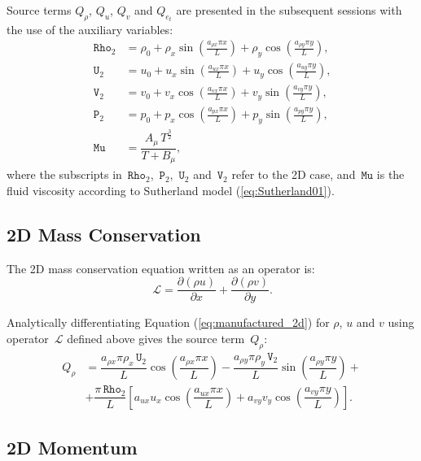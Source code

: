 \documentclass[10pt]{article}
\newcommand{\Diff}[2] {\dfrac{\partial( #1)}{\partial #2}}
\newcommand{\Rho}{\,\mathtt{Rho}}
\newcommand{\PP}{\,\mathtt{P}}
\newcommand{\U}{\,\mathtt{U}}
\newcommand{\V}{\,\mathtt{V}}
\newcommand{\Lo}{\,\mathcal{L}}
\newcommand{\MU}{\,\mathtt{Mu}}
\begin{document}
Source terms $Q_\rho$, $Q_u$, $Q_v$ and $Q_{e_t}$ are presented in the subsequent sessions with the use of the auxiliary variables:
\begin{equation*}
 \begin{split}
\label{eq:aux_2d}
\Rho_2 &= \rho_{0}+ \rho_{x} \sin\left(\frac{a_{ \rho x} \pi x}{L}\right)+ \rho_{y} \cos\left(\frac{a_{ \rho y} \pi y}{L}\right),\\
\U_2 &= u_{0}+u_{x} \sin\left(\frac{a_{u x} \pi x}{L}\right)+u_{y} \cos\left(\frac{a_{u y} \pi y}{L}\right),\\
\V_2 &= v_{0}+v_{x} \cos\left(\frac{a_{v x} \pi x}{L}\right)+v_{y} \sin\left(\frac{a_{v y} \pi y}{L}\right),\\
\PP_2 &= p_{0}+p_{x} \cos\left(\frac{a_{p x} \pi x}{L}\right)+p_{y} \sin\left(\frac{a_{p y} \pi y}{L}\right),\\
\MU  &=\dfrac{A_\mu \, T^{\frac{3}{2}}}{T+B_\mu},
\end{split}
\end{equation*}
%
where the subscripts in $\Rho_2$, $\PP_2$, $\U_2$ and $\V_2$ refer to the 2D case, and $\MU$ is the fluid viscosity according to Sutherland model (\ref{eq:Sutherland01}).

\subsection{2D Mass Conservation}

The 2D mass conservation equation written as an operator is:
\begin{equation*}
 \Lo=  \Diff{\rho u}{x}+\Diff{\rho v}{y}.
\end{equation*}

Analytically differentiating Equation (\ref{eq:manufactured_2d}) for $\rho$, $u$ and $v$ using operator $\Lo$ defined above gives  the source term~$Q_{\rho}$:
\begin{equation}
 \begin{split}
Q_\rho &= \dfrac{a_{\rho x} \pi \rho_x \U_2 }{L}\cos\left(\dfrac{a_{\rho x} \pi x}{L}\right)-\dfrac{a_{\rho y} \pi \rho_y \V_2 }{L}\sin\left(\dfrac{a_{\rho y} \pi y}{L}\right)+\\
&+\dfrac{\pi \Rho_2}{L}\left[a_{ux} u_x \cos\left(\dfrac{a_{ux} \pi x}{L}\right)+a_{vy} v_y \cos\left(\dfrac{a_{vy} \pi y}{L}\right)\right].
 \end{split}
\end{equation}

\subsection{2D Momentum}
\end{document}
